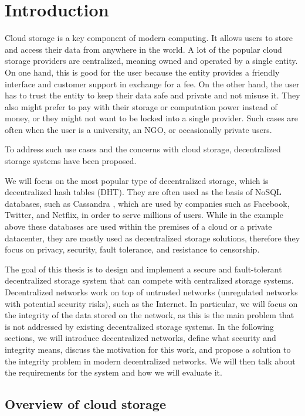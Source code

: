 \label{chapter:introduction}
\chapter{Introduction}

Cloud storage is a key component of modern computing.
It allows users to store and access their data from anywhere in the world.
A lot of the popular cloud storage providers are centralized, meaning owned and operated by a single entity.
On one hand, this is good for the user because the entity provides a friendly interface and customer support
in exchange for a fee.
On the other hand, the user has to trust the entity to keep their data safe and private and not misuse it.
They also might prefer to pay with their storage or computation power instead of money, or 
they might not want to be locked into a single provider.
Such cases are often when the user is a university, an NGO, or occasionally private users.

To address such use cases and the concerns with cloud storage, decentralized storage systems have been proposed.

We will focus on the most popular type of decentralized storage, which is decentralized hash tables (DHT).
They are often used as the basis of NoSQL databases, such as Cassandra \cite{cassandra},
which are used by companies such as Facebook, Twitter, and Netflix, in order to serve millions of users.
While in the example above these databases are used within the premises of a cloud or a private datacenter,
they are mostly used as decentralized storage solutions,
therefore they focus on privacy, security, fault tolerance, and resistance to censorship.

The goal of this thesis is to design and implement a secure and fault-tolerant decentralized storage system
that can compete with centralized storage systems.
Decentralized networks work on top of untrusted networks (unregulated networks with potential security risks),
such as the Internet.
In particular, we will focus on the integrity of the data stored on the network,
as this is the main problem that is not addressed by existing decentralized storage systems.
In the following sections, we will introduce decentralized networks,
define what security and integrity means, discuss the motivation for this work,
and propose a solution to the integrity problem in modern decentralized networks.
We will then talk about the requirements for the system and how we will evaluate it.

\section{Overview of cloud storage}

